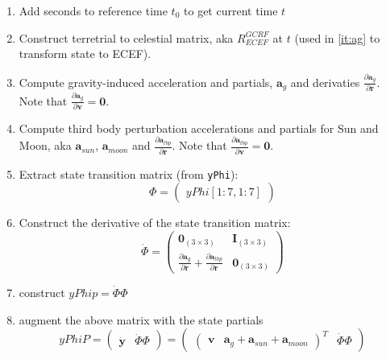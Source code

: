 \begin{enumerate}
    \item Add seconds to reference time $t_0$ to get current time $t$
    
    \item Construct terretrial to celestial matrix, aka $R^{GCRF}_{ECEF}$ at 
        $t$ (used in \ref{it:ag} to transform state to ECEF).
    
    \item \label{it:ag} Compute gravity-induced acceleration and partials, 
        $\bm{a}_g$ and derivaties  
        $\frac{\partial \bm{a}_g}{\partial \bm{r}}$. Note that 
        $\frac{\partial \bm{a}_g}{\partial \bm{v}} = \bm{0}$.
    
    \item \label{it:atbp} Compute third body perturbation accelerations and 
        partials for Sun and Moon, aka $\bm{a}_{sun}$, $\bm{a}_{moon}$ and 
        $\frac{\partial \bm{a}_{tbp}}{\partial \bm{r}}$. Note that 
        $\frac{\partial \bm{a}_{tbp}}{\partial \bm{v}} = \bm{0}$.
    
    \item Extract state transition matrix (from \texttt{yPhi}):
        \begin{equation}
            \Phi = 
            \begin{pmatrix}
                yPhi[1:7, 1:7]
            \end{pmatrix}
        \end{equation}
    
    \item Construct the derivative of the state transition matrix:
        \begin{equation}
            \dot{\Phi} = 
            \begin{pmatrix}
                \bm{0}_{(3 \times 3)} & \bm{I}_{(3 \times 3)} \\
                \frac{\partial \bm{a}_g}{\partial \bm{r}} + 
                    \frac{\partial \bm{a}_{tbp}}{\partial \bm{r}} & \bm{0}_{(3 \times 3)}
            \end{pmatrix}
        \end{equation}
    
    \item construct $yPhip = \dot{\Phi} \Phi$
    
    \item augment the above matrix with the state partials 
        \begin{equation}
            yPhiP = 
            \begin{pmatrix} 
                \dot{\bm{y}} & \dot{\Phi} \Phi 
            \end{pmatrix}  = 
            \begin{pmatrix} 
                \begin{pmatrix} \bm{v} & \bm{a}_g + \bm{a}_{sun} + \bm{a}_{moon} \end{pmatrix}^T 
                & \dot{\Phi} \Phi
            \end{pmatrix}
        \end{equation}
\end{enumerate}